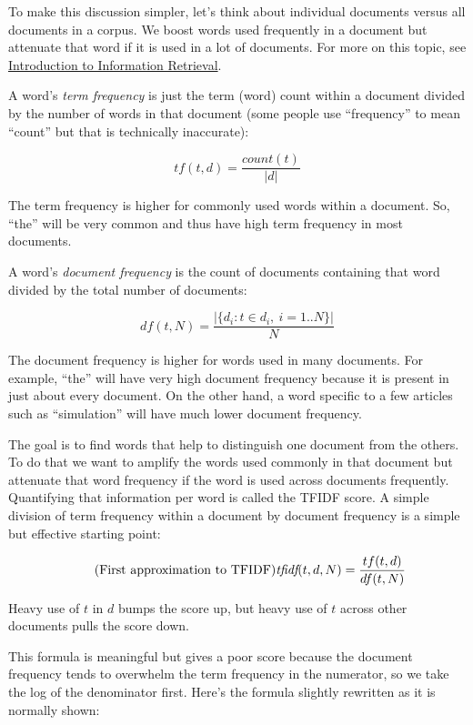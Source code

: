 \documentclass[10pt]{article}
\begin{document}
To make this discussion simpler, let's think about individual documents versus all documents in a corpus. We boost words used frequently in a document but attenuate  that word if it is used in a lot of documents.  For more on this topic, see \href{http://nlp.stanford.edu/IR-book/html/htmledition/term-frequency-and-weighting-1.html}{Introduction to Information Retrieval}.

A word's {\em term frequency} is just the term (word) count within a document divided by the number of words in that document (some people use ``frequency'' to mean ``count'' but that is technically inaccurate):

\[\tag{Term frequency of term $t \in d$, document $d$}
tf(t,d) = \frac{count(t)}{|d|}
\]

\noindent The term frequency is higher for commonly used words within a document. So, ``the'' will be very common and thus have high term frequency in most documents.

A word's {\em document frequency} is the count of documents containing that word divided by the total number of documents:

\[\tag{Document frequency of $t$ in $N$ documents}
df(t,N) = \frac{|\{d_i : t \in d_i, \ i = 1..N\}|}{N}
\]

\noindent The document frequency is higher for words used in many documents. For example, ``the'' will have very high document frequency because it is present in just about every document. On the other hand, a word specific to a few articles such as ``simulation'' will have much lower document frequency.

The goal is to find words that help to distinguish one document from the others. To do that we want to amplify the words used commonly in that document but attenuate that word frequency if the word is used across documents frequently.  Quantifying that information per word is called the TFIDF score. A simple division of term frequency within a document by document frequency is a simple but effective starting point:

\[\tag{First approximation to TFIDF}
\text{\em tfidf}(t,d,N) = \frac{tf(t,d)}{df(t,N)}
\]

Heavy use of $t$ in $d$ bumps the score up, but heavy use of $t$ across other documents pulls the score down.

This formula is meaningful but gives a poor score because the document frequency tends to overwhelm the term frequency in the numerator, so we take the log of the denominator first. Here's the formula slightly rewritten as it is normally shown:
\end{document}
